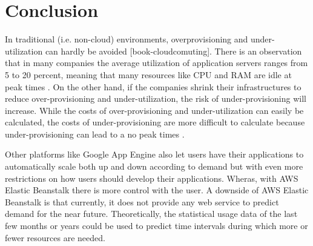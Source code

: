 \documentclass[9pt,twocolumn,twoside]{../../styles/osajnl}
\begin{document}
\section{Conclusion}

In traditional (i.e. non-cloud) environments, overprovisioning and
under-utilization can hardly be avoided [book-cloudcomuting]. There is
an observation that in many companies the average utilization of
application servers ranges from 5 to 20 percent, meaning that many
resources like CPU and RAM are idle at peak times
\cite{cloudcomputing-2}.  On the other hand, if the companies shrink
their infrastructures to reduce over-provisioning and
under-utilization, the risk of under-provisioning will increase. While
the costs of over-provisioning and under-utilization can easily be
calculated, the costs of under-provisioning are more difficult to
calculate because under-provisioning can lead to a no peak times
\cite{cloudcomputing-2}.

Other platforms like Google App Engine \cite{google-appengine} also
let users have their applications to automatically scale both up and
down according to demand but with even more restrictions on how users
should develop their applications. Wheras, with AWS Elastic Beanstalk
there is more control with the user. A downside of AWS Elastic
Beanstalk is that currently, it does not provide any web service to
predict demand for the near future. Theoretically, the statistical
usage data of the last few months or years could be used to predict
time intervals during which more or fewer resources are needed.



 
\end{document}
